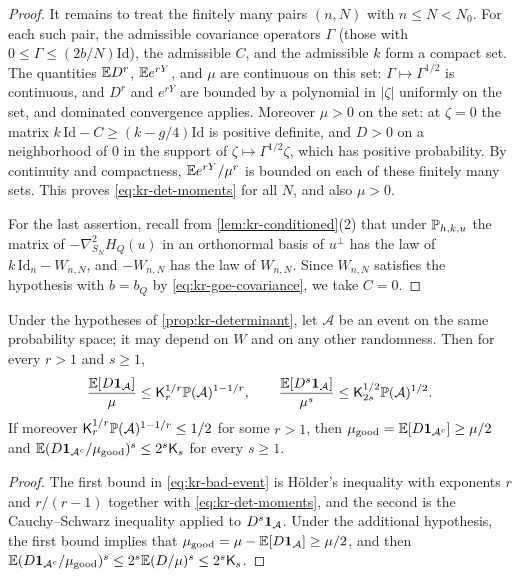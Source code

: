 \begin{proof}
It remains to treat the finitely many pairs $(n,N)$ with $n\le N<N_0$. For each such pair, the admissible covariance operators $\Gamma$ (those with $0\le\Gamma\le(2b/N)\mathrm{Id}$), the admissible $C$, and the admissible $k$ form a compact set. The quantities $\mathbb E D^r$, $\mathbb E e^{rY}$, and $\mu$ are continuous on this set: $\Gamma\mapsto\Gamma^{1/2}$ is continuous, and $D^r$ and $e^{rY}$ are bounded by a polynomial in $|\zeta|$ uniformly on the set, and dominated convergence applies. Moreover $\mu>0$ on the set: at $\zeta=0$ the matrix $k\,\mathrm{Id}-C\ge(k-g/4)\mathrm{Id}$ is positive definite, and $D>0$ on a neighborhood of $0$ in the support of $\zeta\mapsto\Gamma^{1/2}\zeta$, which has positive probability. By continuity and compactness, $\mathbb E e^{rY}/\mu^r$ is bounded on each of these finitely many sets. This proves \eqref{eq:kr-det-moments} for all $N$, and also $\mu>0$.

For the last assertion, recall from \cref{lem:kr-conditioned}(2) that under $\mathbb P_{h,k,u}$ the matrix of $-\nabla^2_{S_N}H_Q(u)$ in an orthonormal basis of $u^\perp$ has the law of $k\,\mathrm{Id}_n-W_{n,N}$, and $-W_{n,N}$ has the law of $W_{n,N}$. Since $W_{n,N}$ satisfies the hypothesis with $b=b_Q$ by \eqref{eq:kr-goe-covariance}, we take $C=0$.
\end{proof}

\begin{corollary}\label{cor:kr-bad-event}
Under the hypotheses of \cref{prop:kr-determinant}, let $\mathcal A$ be an event on the same probability space; it may depend on $W$ and on any other randomness. Then for every $r>1$ and $s\ge1$,
\begin{equation}\label{eq:kr-bad-event}
\frac{\mathbb E[D\mathbf 1_{\mathcal A}]}\mu\le\mathsf K_r^{1/r}\mathbb P(\mathcal A)^{1-1/r},\qquad \frac{\mathbb E[D^s\mathbf 1_{\mathcal A}]}{\mu^s}\le\mathsf K_{2s}^{1/2}\mathbb P(\mathcal A)^{1/2}.
\end{equation}
If moreover $\mathsf K_r^{1/r}\mathbb P(\mathcal A)^{1-1/r}\le1/2$ for some $r>1$, then $\mu_{\rm good}=\mathbb E[D\mathbf 1_{\mathcal A^c}]\ge\mu/2$ and $\mathbb E(D\mathbf 1_{\mathcal A^c}/\mu_{\rm good})^s\le2^s\mathsf K_s$ for every $s\ge1$.
\end{corollary}

\begin{proof}
The first bound in \eqref{eq:kr-bad-event} is H\"older's inequality with exponents $r$ and $r/(r-1)$ together with \eqref{eq:kr-det-moments}, and the second is the Cauchy--Schwarz inequality applied to $D^s\mathbf 1_{\mathcal A}$. Under the additional hypothesis, the first bound implies that $\mu_{\rm good}=\mu-\mathbb E[D\mathbf 1_{\mathcal A}]\ge\mu/2$, and then $\mathbb E(D\mathbf 1_{\mathcal A^c}/\mu_{\rm good})^s\le2^s\mathbb E(D/\mu)^s\le2^s\mathsf K_s$.
\end{proof}

